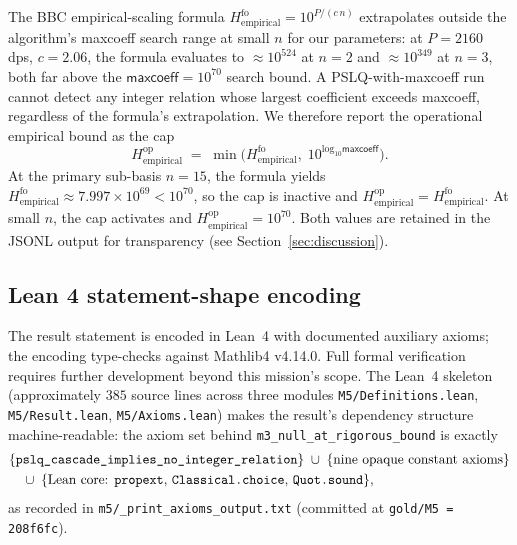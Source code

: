 \documentclass[11pt,a4paper]{article}
\newcommand{\Hempop}{H_{\mathrm{empirical}}^{\mathrm{op}}}
\newcommand{\Hempfo}{H_{\mathrm{empirical}}^{\mathrm{fo}}}
\begin{document}
The BBC empirical-scaling formula
$\Hempfo = 10^{P/(c\,n)}$
extrapolates outside the algorithm's \textsf{maxcoeff} search range at
small $n$ for our parameters:
at $P=2160$ dps, $c=2.06$, the formula evaluates to
$\approx 10^{524}$
at $n=2$ and
$\approx 10^{349}$
at $n=3$, both far above the
$\textsf{maxcoeff}=10^{70}$
search bound.
A PSLQ-with-\textsf{maxcoeff} run cannot detect any integer relation whose
largest coefficient exceeds \textsf{maxcoeff}, regardless of the formula's
extrapolation.
We therefore report the operational empirical bound as the cap
\begin{equation}\label{eq:cap}
  \Hempop \;=\; \min\bigl(\Hempfo,\; 10^{\log_{10}\textsf{maxcoeff}}\bigr).
\end{equation}
At the primary sub-basis $n=15$, the formula yields
$\Hempfo \approx 7.997\times 10^{69} < 10^{70}$,
so the cap is inactive and $\Hempop = \Hempfo$.
At small $n$, the cap activates and $\Hempop = 10^{70}$.
Both values are retained in the JSONL output for transparency
(see Section~\ref{sec:discussion}).

\subsection{Lean 4 statement-shape encoding}\label{sec:lean-scope}

The result statement is encoded in Lean~4 with documented auxiliary
axioms; the encoding type-checks against Mathlib4 v4.14.0.
Full formal verification requires further development beyond this
mission's scope.
The Lean~4 skeleton (approximately $385$ source lines across three modules
\texttt{M5/Definitions.lean}, \texttt{M5/Result.lean},
\texttt{M5/Axioms.lean}) makes the result's dependency structure
machine-readable: the axiom set behind
\texttt{m3\_null\_at\_rigorous\_bound}
is exactly
\begin{equation*}
  \begin{aligned}
    &\{\texttt{pslq\_cascade\_implies\_no\_integer\_relation}\}
    \;\cup\;
    \{\text{nine opaque constant axioms}\} \\
    &\hspace{1em}\cup\;
    \{\text{Lean core: \texttt{propext}, \texttt{Classical.choice}, \texttt{Quot.sound}}\},
  \end{aligned}
\end{equation*}
as recorded in \texttt{m5/\_print\_axioms\_output.txt} (committed at
\texttt{gold/M5 = 208f6fc}).
\end{document}
